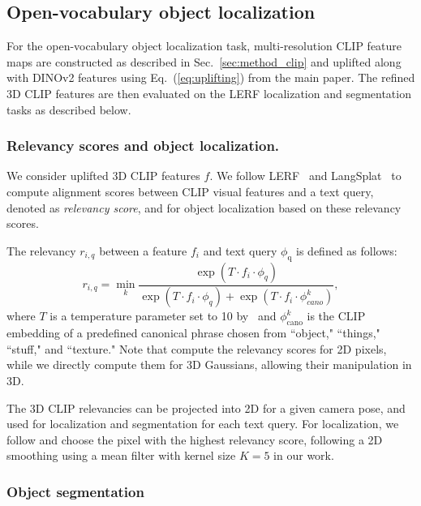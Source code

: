 \subsection{Open-vocabulary object localization}
\label{sec:appendix-clip}

For the open-vocabulary object localization task, multi-resolution CLIP feature maps are constructed as described in Sec.~\ref{sec:method_clip} 
and uplifted along with DINOv2 features using Eq.~(\ref{eq:uplifting}) from the main paper.
The refined 3D CLIP features are then evaluated on the LERF localization and segmentation tasks as described below.

\subsubsection{Relevancy scores and object localization.}

We consider uplifted 3D CLIP features $f$.
We follow LERF~\citep{kerr2023lerf} and LangSplat~\citep{qin2023langsplat} to compute alignment scores between CLIP visual features and a text query, denoted as \emph{relevancy score}, and for object localization based on these relevancy scores.

The relevancy $r_{i,q}$ between a feature $f_i$ and text query $\phi_{\text{q}}$ is defined as follows:
\begin{equation}
r_{i,q} = \min_k \frac{\exp(T \cdot f_i \cdot \phi_{q})}{\exp(T \cdot f_i \cdot \phi_{q}) + \exp(T \cdot f_i \cdot \phi_{cano}^k)},
\end{equation}
where $T$ is a temperature parameter set to 10 by~\cite{kerr2023lerf} and $\phi_{\text{cano}}^k$ is the CLIP embedding of a predefined canonical phrase chosen from “object," “things," “stuff," and “texture."
Note that \cite{qin2023langsplat} compute the relevancy scores for 2D pixels, while we directly compute them for 3D Gaussians, allowing their manipulation in 3D.


The 3D CLIP relevancies can be projected into 2D for a given camera pose, and used for localization and segmentation for each text query. For localization, we follow \cite{qin2023langsplat} and choose the pixel with the highest relevancy score, following a 2D smoothing using a mean filter with kernel size $K=5$ in our work. 

\subsubsection{Object segmentation}

